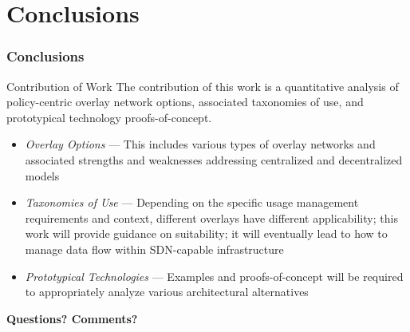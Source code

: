 \section{Conclusions}

\begin{frame}
\frametitle{Conclusions}
\begin{beamerboxesrounded}[shadow]{Contribution of Work}
The contribution of this work is a quantitative analysis of policy-centric overlay network options, associated taxonomies of use, and prototypical technology proofs-of-concept.
\end{beamerboxesrounded}
\begin{itemize}
\item \textit{Overlay Options} --- This includes various types of overlay networks and associated strengths and weaknesses addressing centralized and decentralized models
\item \textit{Taxonomies of Use} --- Depending on the specific usage management requirements and context, different overlays have different applicability; this work will provide guidance on suitability; it will eventually lead to how to manage data flow within SDN-capable infrastructure
\item \textit{Prototypical Technologies} --- Examples and proofs-of-concept will be required to appropriately analyze various architectural alternatives
\end{itemize}
\end{frame}

\begin{frame}[c]
\begin{center}
\textbf{Questions? Comments?}
\end{center}
\end{frame}